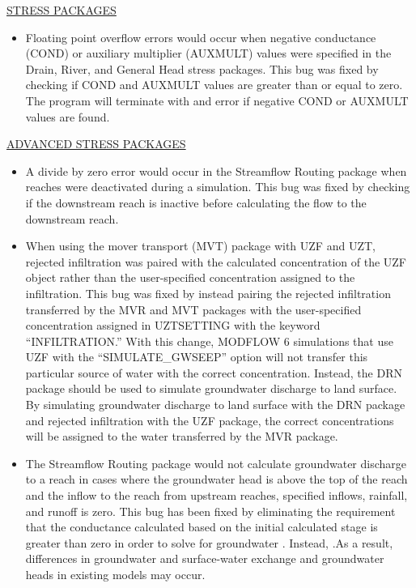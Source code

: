 
	\underline{STRESS PACKAGES}
	\begin{itemize}
		\item Floating point overflow errors would occur when negative conductance (COND) or auxiliary multiplier (AUXMULT) values were specified in the Drain, River, and General Head stress packages. This bug was fixed by checking if COND and AUXMULT values are greater than or equal to zero. The program will terminate with and error if negative COND or AUXMULT values are found.
	\end{itemize}

	\underline{ADVANCED STRESS PACKAGES}
	\begin{itemize}
		\item A divide by zero error would occur in the Streamflow Routing package when reaches were deactivated during a simulation. This bug was fixed by checking if the downstream reach is inactive before calculating the flow to the downstream reach.
		\item When using the mover transport (MVT) package with UZF and UZT, rejected infiltration was paired with the calculated concentration of the UZF object rather than the user-specified concentration assigned to the infiltration.  This bug was fixed by instead pairing the rejected infiltration transferred by the MVR and MVT packages with the user-specified concentration assigned in UZTSETTING with the keyword ``INFILTRATION.''  With this change, MODFLOW 6 simulations that use UZF with the ``SIMULATE\_GWSEEP'' option will not transfer this particular source of water with the correct concentration.  Instead, the DRN package should be used to simulate groundwater discharge to land surface.  By simulating groundwater discharge to land surface with the DRN package and rejected infiltration with the UZF package, the correct concentrations will be assigned to the water transferred by the MVR package.
		\item The Streamflow Routing package would not calculate groundwater discharge to a reach in cases where the groundwater head is above the top of the reach and the inflow to the reach from upstream reaches, specified inflows, rainfall, and runoff is zero. This bug has been fixed by eliminating the requirement that the conductance calculated based on the initial calculated stage is greater than zero in order to solve for groundwater . Instead, .As a result, differences in groundwater and surface-water exchange and groundwater heads in existing models may occur.  
	\end{itemize}

